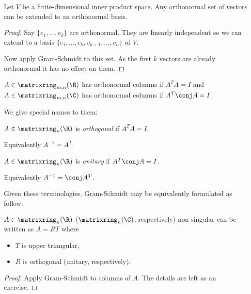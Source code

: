 \documentclass[a4paper]{article}
\newcommand*{\M}{\matrixring}
\theoremstyle{definition}
\begin{document}
\begin{corollary}
  Let \(V\) be a finite-dimensional inner product space. Any orthonormal set of vectors can be extended to an orthonormal basis.
\end{corollary}

\begin{proof}
  Say \(\{e_1, \dots, e_k\}\) are orthonormal. They are linearly independent so we can extend to a basis \(\{e_1, \dots, e_k, v_{k + 1}, \dots, v_n\}\) of \(V\).

  Now apply Gram-Schmidt to this set. As the first \(k\) vectors are already orthonormal it has no effect on them.
\end{proof}

\begin{note}
  \(A \in \M_{m, n}(\R)\) has orthonormal columns if \(A^TA = I\) and \(A \in \M_{m, n}(\C)\) has orthonormal columns if \(A^T \conj A = I\).
\end{note}

We give special names to them:

\begin{definition}
  \(A \in \M_n(\R)\) is \emph{orthogonal} if \(A^T A = I\).
\end{definition}

Equivalently \(A^{-1} = A^T\).

\begin{definition}
  \(A \in \M_n(\R)\) is \emph{unitary} if \(A^T \conj A = I\).
\end{definition}

Equivalently \(A^{-1} = \conj A^T\).

Given these terminologies, Gram-Schmidt may be equivalently formulated as follow:

\begin{proposition}
  \(A \in \M_n(\R)\) (\(\M_n(\C)\), respectively) non-singular can be written as \(A = RT\) where
  \begin{itemize}
  \item \(T\) is upper triangular,
  \item \(R\) is orthogonal (unitary, respectively).
  \end{itemize}
\end{proposition}

\begin{proof}
  Apply Gram-Schmidt to columns of \(A\). The details are left as an exercise.
\end{proof}
\end{document}
